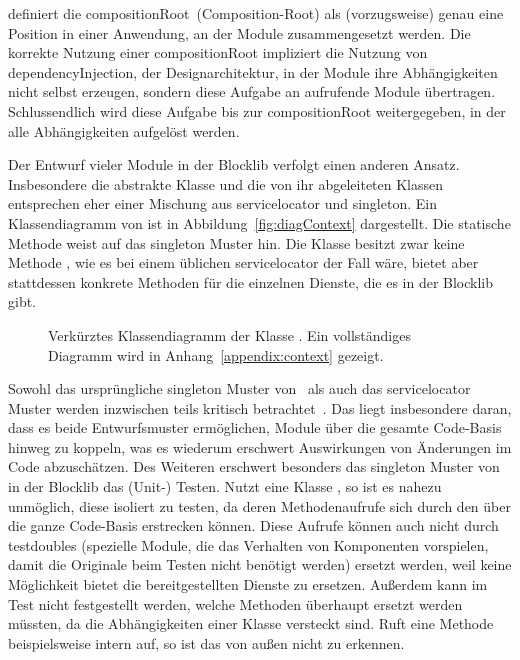 \textcite[S.~76]{Seemann2012} definiert die \gls{compositionRoot}~(Composition-Root) als (vorzugsweise) genau eine Position in einer Anwendung, an der Module zusammengesetzt werden. Die korrekte Nutzung einer \gls{compositionRoot} impliziert die Nutzung von \gls{dependencyInjection}, der Designarchitektur, in der Module ihre Abhängigkeiten nicht selbst erzeugen, sondern diese Aufgabe an aufrufende Module übertragen. Schlussendlich wird diese Aufgabe bis zur \gls{compositionRoot} weitergegeben, in der alle Abhängigkeiten aufgelöst werden. 


Der Entwurf vieler Module in der Blocklib verfolgt einen anderen Ansatz. Insbesondere die abstrakte Klasse \classContext{} und die von ihr abgeleiteten Klassen entsprechen eher einer Mischung aus \gls{servicelocator} und \gls{singleton}. Ein Klassendiagramm von \classContext{} ist in Abbildung~\vref{fig:diagContext} dargestellt. Die statische Methode  weist auf das \gls{singleton} Muster hin. Die Klasse besitzt zwar keine Methode , wie es bei einem üblichen \gls{servicelocator} der Fall wäre, bietet aber stattdessen konkrete Methoden für die einzelnen Dienste, die es in der Blocklib gibt.

\begin{figure}
  \begin{center}
    
  \end{center}
  \caption[Verkürztes Klassendiagramm der Klasse \classContext{}.]{Verkürztes Klassendiagramm der Klasse \classContext{}. Ein vollständiges Diagramm wird in Anhang~\vref{appendix:context} gezeigt.}\label{fig:diagContext}
\end{figure}

Sowohl das ursprüngliche \gls{singleton} Muster von~\textcite[S.~127~ff.]{Gamma2016} als auch das \gls{servicelocator} Muster werden inzwischen teils kritisch betrachtet~\cites[S.~103~ff.]{Nystrom2015}[S.~154~ff.]{Seemann2012}. Das liegt insbesondere daran, dass es beide Entwurfsmuster ermöglichen, Module über die gesamte Code-Basis hinweg zu koppeln, was es wiederum erschwert Auswirkungen von Änderungen im Code abzuschätzen. Des Weiteren erschwert besonders das \gls{singleton} Muster von \classContext{} in der Blocklib das (Unit-) Testen. Nutzt eine Klasse \classContext{}, so ist es nahezu unmöglich, diese isoliert zu testen, da deren Methodenaufrufe sich durch den \classContext{} über die ganze Code-Basis erstrecken können. Diese  Aufrufe können auch nicht durch \glspl{testdouble} (spezielle Module, die das Verhalten von Komponenten vorspielen, damit die Originale beim Testen nicht benötigt werden) ersetzt werden, weil \classContext{} keine Möglichkeit bietet die bereitgestellten Dienste zu ersetzen. Außerdem kann im Test nicht festgestellt werden, welche Methoden überhaupt ersetzt werden müssten, da die Abhängigkeiten einer Klasse versteckt sind. Ruft eine Methode beispielsweise intern  auf, so ist das von außen nicht zu erkennen.

